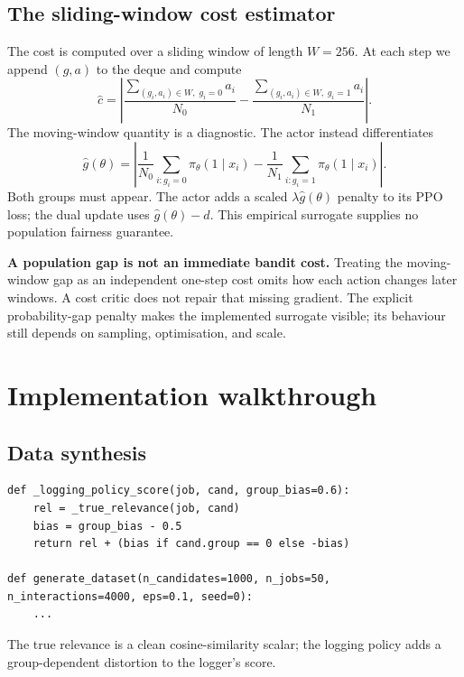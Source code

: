 \documentclass[11pt,oneside]{scrbook}
\begin{document}
\section{The sliding-window cost estimator}

The cost is computed over a sliding window of length $W = 256$. At each
step we append $(g, a)$ to the deque and compute
\[
   \hat c = \left| \frac{\sum_{(g_i, a_i) \in W,\; g_i = 0} a_i}{N_0}
                  - \frac{\sum_{(g_i, a_i) \in W,\; g_i = 1} a_i}{N_1} \right|.
\]
The moving-window quantity is a diagnostic. The actor instead differentiates
\[
 \hat g(\theta)=\left|\frac{1}{N_0}\sum_{i:g_i=0}\pi_\theta(1\mid x_i)
 -\frac{1}{N_1}\sum_{i:g_i=1}\pi_\theta(1\mid x_i)\right|.
\]
Both groups must appear. The actor adds a scaled $\lambda\hat g(\theta)$
penalty to its PPO loss; the dual update uses $\hat g(\theta)-d$.
This empirical surrogate supplies no population fairness guarantee.

\begin{pitfall}
\textbf{A population gap is not an immediate bandit cost.} Treating the
moving-window gap as an independent one-step cost omits how each action
changes later windows. A cost critic does not repair that missing gradient.
The explicit probability-gap penalty makes the implemented surrogate
visible; its behaviour still depends on sampling, optimisation, and scale.
\end{pitfall}

\chapter{Implementation walkthrough}

\section{Data synthesis}

\begin{verbatim}
def _logging_policy_score(job, cand, group_bias=0.6):
    rel = _true_relevance(job, cand)
    bias = group_bias - 0.5
    return rel + (bias if cand.group == 0 else -bias)

def generate_dataset(n_candidates=1000, n_jobs=50, n_interactions=4000, eps=0.1, seed=0):
    ...
\end{verbatim}

The true relevance is a clean cosine-similarity scalar; the logging policy
adds a group-dependent distortion to the logger's score.
\end{document}
